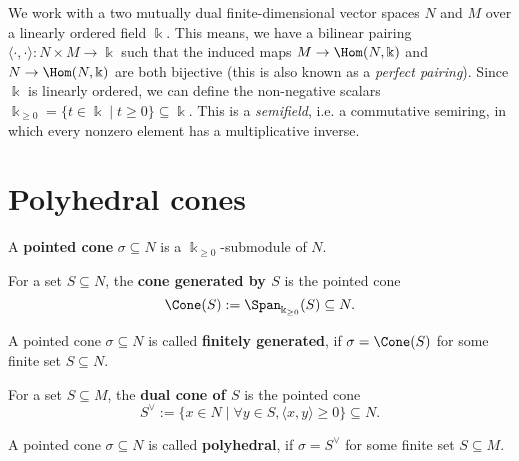 We work with a two mutually dual finite-dimensional vector spaces \( N
\) and \( M \) over a linearly ordered field \( \Bbbk \). This means,
we have a bilinear pairing \( \langle \cdot, \cdot \rangle \colon N
\times M \to \Bbbk \) such that the induced maps \( M \to
\Hom(N,\Bbbk) \) and \( N \to \Hom(N,\Bbbk) \) are both bijective
(this is also known as a \emph{perfect pairing}). Since \( \Bbbk \) is
linearly ordered, we can define the non-negative scalars \(\Bbbk_{\geq
0} = \{t \in \Bbbk \mid t \geq 0 \} \subseteq \Bbbk\). This is a
\emph{semifield}, i.e. a commutative semiring, in which every nonzero
element has a multiplicative inverse.

\section{Polyhedral cones}

\begin{definition}
  \label{3-pointed-cone}
  \uses{}
  \leanok
  A {\bf pointed cone} \( \sigma \subseteq N \) is a \( \Bbbk_{\geq 0}
  \)-submodule of \( N \).
\end{definition}

\begin{definition}
  \label{3-cone-span}
  \leanok
  For a set \( S \subseteq N \), the {\bf cone generated by \( S \)}
  is the pointed cone
  \[
      \Cone(S) := \Span_{\Bbbk_{\geq 0}}(S) \subseteq N.
  \]
\end{definition}

\begin{definition}
  \label{3-cone-finitely-generated}
  \leanok
  A pointed cone \( \sigma \subseteq N \) is called {\bf finitely
  generated}, if \( \sigma = \Cone(S) \) for some finite set \( S
  \subseteq N \).
\end{definition}

\begin{definition}
  \label{3-cone-dual}
  \leanok
  For a set \( S \subseteq M \), the {\bf dual cone of \( S \)} is
  the pointed cone
  \[
      S^\vee := \{x \in N \mid \forall y \in S, \langle x, y \rangle
      \geq 0 \} \subseteq N.
  \]
\end{definition}

\begin{definition}
  \label{3-polyhedral-cone}
  \leanok
  A pointed cone \( \sigma \subseteq N \) is called {\bf polyhedral},
  if \( \sigma = S^\vee \) for some finite set \( S \subseteq M \).
\end{definition}

